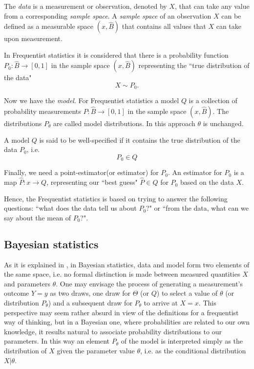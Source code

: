 \documentclass[onecolumn,           %
               showpacs,            %
               preprintnumbers,     %
               aps,                 %
               prl,          	    %
               letterpaper,             %
               superscriptaddress,      %
               nofootinbib,         %
               tightenlines,        %
               floats,floatfix      %
               ,usenatbib,
               ]{revtex4-1}
\begin{document}
The \textit{data} is a measurement or observation, denoted by $X$, that can take any value from a corresponding \textit{sample space}. A \textit{sample space} of an observation $X$ can be defined as a measurable space $(x,\hat B)$ that contains all values that $X$ can take upon measurement.

In Frequentist statistics it is considered that there is a probability function $P_0:\hat B\rightarrow [0,1]$ in the sample space $(x,\hat B)$ representing the ``true distribution of the data"
\[X\sim P_0.\]

Now we have the \textit{model}. For Frequentist statistics a model $Q$ is a collection of probability measurements $P:\hat B\rightarrow[0,1]$ in the sample space $(x,\hat B)$. The distributions $P_\theta$ are called model distributions. In this approach $\theta$ is unchanged. 

A model $Q$ is said to be well-specified if it contains the true distribution of the data $P_0$, i.e.
\[P_0\in Q\]

Finally, we need a point-estimator(or estimator) for $P_0$. An estimator for $P_0$ is a map $\hat P:x\rightarrow Q$, representing our ``best guess" $\hat P\in Q$ for $P_0$ based on the data $X$.

Hence, the Frequentist statistics is based on trying to answer the following questions: ``what does the data tell us about $P_0$?" or ``from the data, what can we say about the mean of $P_0$?".

\subsection{Bayesian statistics}

As it is explained in \cite{bayeslecture}, in Bayesian statistics, data and model form two elements of the same space, i.e. no formal distinction is made between measured quantities $X$ and parameters $\theta$. One may envisage the process of generating a measurement's outcome $Y=y$ as two draws, one draw for $\Theta$ (or $Q$) to select a value of $\theta$ (or distribution $P_\theta$) and a subsequent draw for $P_\theta$ to arrive at $X=x$. This perspective may seem rather absurd in view of the definitions for a frequentist way of thinking, but in a Bayesian one, where probabilities are related to our own knowledge, it results natural to associate probability distributions to our parameters. In this way an element $P_\theta$ of the model is interpreted simply as the distribution of $X$ given the parameter value $\theta$, i.e. as the conditional distribution $X|\theta$.
\end{document}
